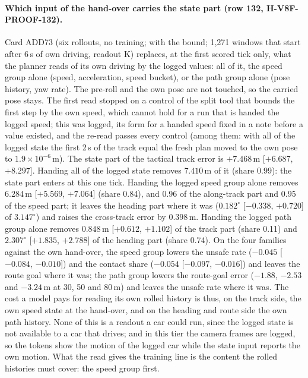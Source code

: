 \paragraph{Which input of the hand-over carries the state part (row 132, H-V8F-PROOF-132).} Card ADD73 (six rollouts, no training;  with the bound; 1,271 windows that start after 6\,s of own driving, readout K) replaces, at the first scored tick only, what the planner reads of its own driving by the logged values: all of it, the speed group alone (speed, acceleration, speed bucket), or the path group alone (pose history, yaw rate). The pre-roll and the own pose are not touched, so the carried pose stays. The first read stopped on a control of the split tool that bounds the first step by the own speed, which cannot hold for a run that is handed the logged speed; this was logged, its form for a handed speed fixed in a note before a value existed, and the re-read passes every control (among them: with all of the logged state the first 2\,s of the track equal the fresh plan moved to the own pose to $1.9\times10^{-6}$\,m). The state part of the tactical track error is $+7.468$\,m [$+6.687$, $+8.297$]. Handing all of the logged state removes $7.410$\,m of it (share 0.99): the state part enters at this one tick. Handing the logged speed group alone removes $6.284$\,m [$+5.569$, $+7.064$] (share 0.84), and 0.96 of the along-track part and 0.95 of the speed part; it leaves the heading part where it was ($0.182^\circ$ [$-0.338$, $+0.720$] of $3.147^\circ$) and raises the cross-track error by $0.398$\,m. Handing the logged path group alone removes $0.848$\,m [$+0.612$, $+1.102$] of the track part (share 0.11) and $2.307^\circ$ [$+1.835$, $+2.788$] of the heading part (share 0.74). On the four families against the own hand-over, the speed group lowers the unsafe rate ($-0.045$ [$-0.084$, $-0.010$]) and the contact share ($-0.054$ [$-0.097$, $-0.016$]) and leaves the route goal where it was; the path group lowers the route-goal error ($-1.88$, $-2.53$ and $-3.24$\,m at 30, 50 and 80\,m) and leaves the unsafe rate where it was. The cost a model pays for reading its own rolled history is thus, on the track side, the own speed state at the hand-over, and on the heading and route side the own path history. None of this is a readout a car could run, since the logged state is not available to a car that drives; and in this tier the camera frames are logged, so the tokens show the motion of the logged car while the state input reports the own motion. What the read gives the training line is the content the rolled histories must cover: the speed group first.


